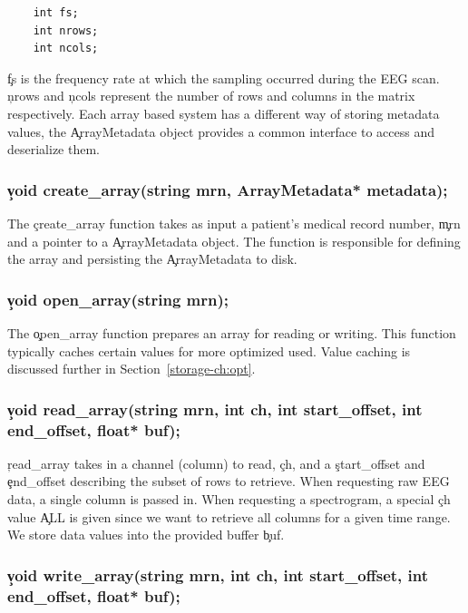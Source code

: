 \begin{lstlisting}
    int fs;
    int nrows;
    int ncols;
\end{lstlisting}

\c{fs} is the frequency rate at which the sampling occurred during the EEG
scan. \c{nrows} and \c{ncols} represent the number of rows and columns in the
matrix respectively.  Each array based system has a different way of storing
metadata values, the \c{ArrayMetadata} object provides a common interface to
access and deserialize them.

\subsubsection{\c{void create\_array(string mrn, ArrayMetadata* metadata);}}

The \c{create\_array} function takes as input a patient's medical record
number, \c{mrn} and a pointer to a \c{ArrayMetadata} object. The function is
responsible for defining the array and persisting the \c{ArrayMetadata} to
disk.

\subsubsection{\c{void open\_array(string mrn);}}

The \c{open\_array} function prepares an array for reading or writing. This
function typically caches certain values for more optimized used. Value caching is
discussed further in Section~\ref{storage-ch:opt}.

\subsubsection{\c{void read\_array(string mrn, int ch, int start\_offset, int end\_offset, float* buf);}}

\c{read\_array} takes in a channel (column) to read, \c{ch}, and a
\c{start\_offset} and \c{end\_offset} describing the subset of rows to
retrieve. When requesting raw EEG data, a single column is passed in. When
requesting a spectrogram, a special \c{ch} value \c{ALL} is given since we want
to retrieve all columns for a given time range. We store data values into
the provided buffer \c{buf}.

\subsubsection{\c{void write\_array(string mrn, int ch, int start\_offset, int end\_offset, float* buf);}}

